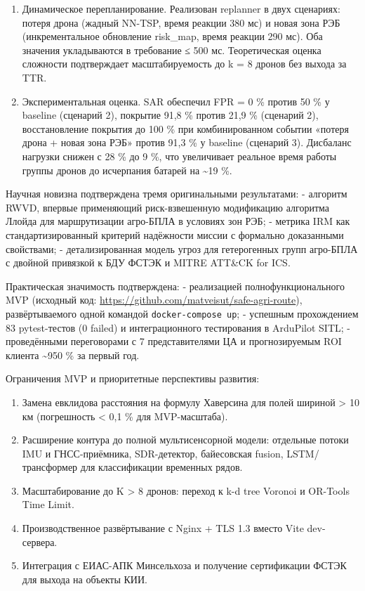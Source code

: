 \documentclass[14pt,a4paper]{extarticle}
\providecommand{\tightlist}{%
  \setlength{\itemsep}{0pt}\setlength{\parskip}{0pt}}
\begin{document}
\begin{enumerate}
  Алгоритмы маршрутизации. Разработан алгоритм Risk-Weighted Voronoi Decomposition с доказанной сходимостью за конечное число итераций. Penalty-граф на NetworkX гарантирует нулевой FPR при severity ≥ 0,01. Задача CVRP решена через Google OR-Tools (PATH\_CHEAPEST\_ARC + 2-opt), время планирования для поля 500 га --- фактически 347 мс при требовании ≤ 5 секунд.
\item
  Динамическое перепланирование. Реализован replanner в двух сценариях: потеря дрона (жадный NN-TSP, время реакции 380 мс) и новая зона РЭБ (инкрементальное обновление risk\_map, время реакции 290 мс). Оба значения укладываются в требование ≤ 500 мс. Теоретическая оценка сложности подтверждает масштабируемость до k = 8 дронов без выхода за TTR.
\item
  Экспериментальная оценка. SAR обеспечил FPR = 0 \% против 50 \% у baseline (сценарий 2), покрытие 91,8 \% против 21,9 \% (сценарий 2), восстановление покрытия до 100 \% при комбинированном событии «потеря дрона + новая зона РЭБ» против 91,3 \% у baseline (сценарий 3). Дисбаланс нагрузки снижен с 28 \% до 9 \%, что увеличивает реальное время работы группы дронов до исчерпания батарей на \textasciitilde19 \%.
\end{enumerate}

Научная новизна подтверждена тремя оригинальными результатами: - алгоритм RWVD, впервые применяющий риск-взвешенную модификацию алгоритма Ллойда для маршрутизации агро-БПЛА в условиях зон РЭБ; - метрика IRM как стандартизированный критерий надёжности миссии с формально доказанными свойствами; - детализированная модель угроз для гетерогенных групп агро-БПЛА с двойной привязкой к БДУ ФСТЭК и MITRE ATT\&CK for ICS.

Практическая значимость подтверждена: - реализацией полнофункционального MVP (исходный код: \url{https://github.com/matveisut/safe-agri-route}), развёртываемого одной командой \texttt{docker-compose\ up}; - успешным прохождением 83 pytest-тестов (0 failed) и интеграционного тестирования в ArduPilot SITL; - проведёнными переговорами с 7 представителями ЦА и прогнозируемым ROI клиента \textasciitilde950 \% за первый год.

Ограничения MVP и приоритетные перспективы развития:

\begin{enumerate}
\def\labelenumi{\arabic{enumi}.}
\tightlist
\item
  Замена евклидова расстояния на формулу Хаверсина для полей шириной \textgreater{} 10 км (погрешность \textless{} 0,1 \% для MVP-масштаба).
\item
  Расширение контура до полной мультисенсорной модели: отдельные потоки IMU и ГНСС-приёмника, SDR-детектор, байесовская fusion, LSTM/трансформер для классификации временных рядов.
\item
  Масштабирование до K \textgreater{} 8 дронов: переход к k-d tree Voronoi и OR-Tools Time Limit.
\item
  Производственное развёртывание с Nginx + TLS 1.3 вместо Vite dev-сервера.
\item
  Интеграция с ЕИАС-АПК Минсельхоза и получение сертификации ФСТЭК для выхода на объекты КИИ.
\end{enumerate}
\end{document}
